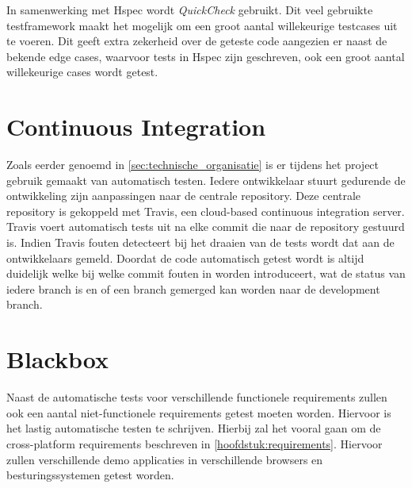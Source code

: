 In samenwerking met Hspec wordt \emph{QuickCheck}\cite{QuickCheck} gebruikt. Dit veel gebruikte testframework maakt het mogelijk om een groot aantal willekeurige testcases uit te voeren. Dit geeft extra zekerheid over de geteste code aangezien er naast de bekende edge cases, waarvoor tests in Hspec zijn geschreven, ook een groot aantal willekeurige cases wordt getest.

\section{Continuous Integration}
Zoals eerder genoemd in \autoref{sec:technische_organisatie} is er tijdens het project gebruik gemaakt van automatisch testen. Iedere ontwikkelaar stuurt gedurende de ontwikkeling zijn aanpassingen naar de centrale repository. Deze centrale repository is gekoppeld met Travis, een cloud-based continuous integration server. Travis voert automatisch tests uit na elke commit die naar de repository gestuurd is. Indien Travis fouten detecteert bij het draaien van de tests wordt dat aan de ontwikkelaars gemeld. Doordat de code automatisch getest wordt is altijd duidelijk welke bij welke commit fouten in worden introduceert, wat de status van iedere branch is en of een branch gemerged kan worden naar de development branch.

\section{Blackbox}
Naast de automatische tests voor verschillende functionele requirements zullen ook een aantal niet-functionele requirements getest moeten worden. Hiervoor is het lastig automatische testen te schrijven. Hierbij zal het vooral gaan om de cross-platform requirements beschreven in \autoref{hoofdstuk:requirements}. Hiervoor zullen verschillende demo applicaties in verschillende browsers en besturingssystemen getest worden.
